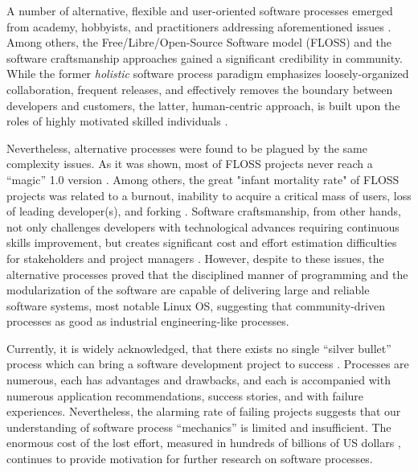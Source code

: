 A number of alternative, flexible and user-oriented software processes emerged from 
academy, hobbyists, and practitioners addressing aforementioned issues \cite{citeulike:3729379}. 
Among others, the Free/Libre/Open-Source Software model (FLOSS) and the software craftsmanship  
approaches gained a significant credibility in community. 
While the former \textit{holistic} software process paradigm emphasizes loosely-organized 
collaboration, frequent releases, and effectively removes the boundary between developers 
and customers, the latter, human-centric approach, is built upon the roles of highly 
motivated skilled individuals \cite{citeulike:262020} \cite{citeulike:2759198}. 

Nevertheless, alternative processes were found to be plagued by the same complexity issues. 
As it was shown, most of FLOSS projects never reach a ``magic'' 1.0 version \cite{citeulike:12480029}. 
Among others, the great "infant mortality rate" of FLOSS projects was related to a burnout, 
inability to acquire a critical mass of users, loss of leading developer(s), and forking \cite{richter2007critique}. 
Software craftsmanship, from other hands, not only challenges developers with technological advances 
requiring continuous skills improvement, but creates significant cost and effort estimation difficulties for
stakeholders and project managers \cite{citeulike:11058784}. However, despite to these issues, 
the alternative processes proved that the disciplined manner of programming and the modularization  
of the software are capable of delivering large and reliable software systems, most notable Linux OS,
suggesting that community-driven processes as good as industrial engineering-like processes.

Currently, it is widely acknowledged, that there exists no single ``silver bullet'' process which 
can bring a software development project to success \cite{citeulike:1986013}. 
Processes are numerous, each has advantages and drawbacks, and each is accompanied with 
numerous application recommendations, success stories, and with failure experiences. Nevertheless,
the alarming rate of failing projects suggests that our understanding of software process ``mechanics''  
is limited and insufficient\cite{citeulike:12550665}. 
The enormous cost of the lost effort, measured in hundreds of billions of US dollars 
\cite{citeulike:2207657} \cite{citeulike:2207653} \cite{citeulike:2207655}, 
continues to provide motivation for further research on software processes. 

%
%
